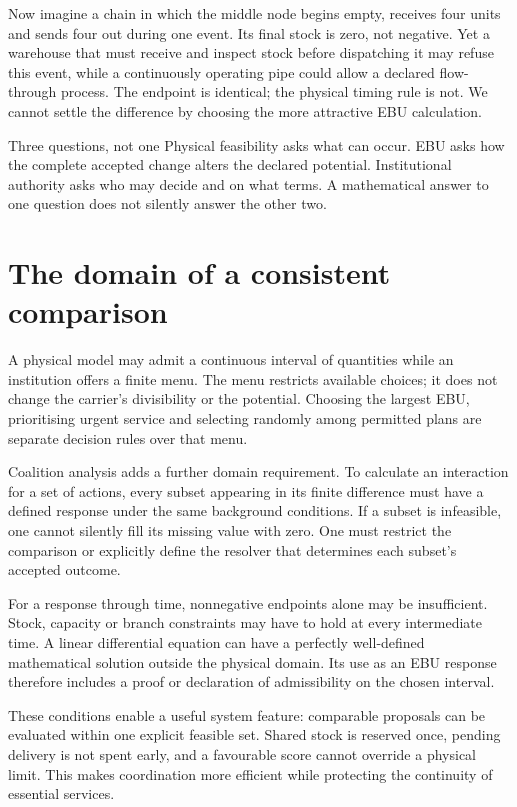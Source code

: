Now imagine a chain in which the middle node begins empty, receives four
units and sends four out during one event. Its final stock is zero, not
negative. Yet a warehouse that must receive and inspect stock before
dispatching it may refuse this event, while a continuously operating pipe
could allow a declared flow-through process. The endpoint is identical;
the physical timing rule is not. We cannot settle the difference by
choosing the more attractive EBU calculation.

\begin{cautionbox}{Three questions, not one}
Physical feasibility asks what can occur. EBU asks how the complete accepted
change alters the declared potential. Institutional authority asks who may
decide and on what terms. A mathematical answer to one question does not
silently answer the other two.
\end{cautionbox}

\section{The domain of a consistent comparison}
A physical model may admit a continuous interval of quantities while an institution offers a finite menu. The menu restricts available choices; it does not change the carrier's divisibility or the potential. Choosing the largest EBU, prioritising urgent service and selecting randomly among permitted plans are separate decision rules over that menu.

Coalition analysis adds a further domain requirement. To calculate an interaction for a set of actions, every subset appearing in its finite difference must have a defined response under the same background conditions. If a subset is infeasible, one cannot silently fill its missing value with zero. One must restrict the comparison or explicitly define the resolver that determines each subset's accepted outcome.

For a response through time, nonnegative endpoints alone may be insufficient. Stock, capacity or branch constraints may have to hold at every intermediate time. A linear differential equation can have a perfectly well-defined mathematical solution outside the physical domain. Its use as an EBU response therefore includes a proof or declaration of admissibility on the chosen interval.

These conditions enable a useful system feature: comparable proposals can be evaluated within one explicit feasible set. Shared stock is reserved once, pending delivery is not spent early, and a favourable score cannot override a physical limit. This makes coordination more efficient while protecting the continuity of essential services.

